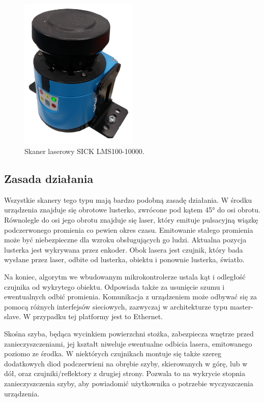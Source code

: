 	\begin{figure}[h]
	\centering
	\includegraphics[width=0.5\textwidth]{graphics/sensor.png}
	\caption{Skaner laserowy SICK LMS100-10000.}
	\label{fig:sensor}
	\end{figure} 

	\subsection{Zasada działania}
		Wszystkie skanery tego typu mają bardzo podobną zasadę działania.
		W środku urządzenia znajduje się obrotowe lusterko, zwrócone pod kątem 45° do osi obrotu.
		Równolegle do osi jego obrotu znajduje się laser, który emituje pulsacyjną wiązkę podczerwonego promienia co pewien okres czasu.
		Emitowanie stałego promienia może być niebezpieczne dla wzroku obsługujących go ludzi.
		Aktualna pozycja lusterka jest wykrywana przez enkoder.
		Obok lasera jest czujnik, który bada wysłane przez laser, odbite od lusterka, obiektu i ponownie lusterka, światło.

		Na koniec, algorytm we wbudowanym mikrokontrolerze ustala kąt i odległość czujnika od wykrytego obiektu.
		Odpowiada także za usunięcie szumu i ewentualnych odbić promienia.
		Komunikacja z urządzeniem może odbywać się za pomocą różnych interfejsów sieciowych, zazwyczaj w architekturze typu master-slave.
		W przypadku tej platformy jest to Ethernet.
		
		Skośna szyba, będąca wycinkiem powierzchni stożka, zabezpiecza wnętrze przed zanieczyszczeniami, jej kształt niweluje ewentualne odbicia lasera, emitowanego poziomo ze środka.
		W niektórych czujnikach montuje się także szereg dodatkowych diod podczerwieni na obrębie szyby, skierowanych w górę, lub w dół, oraz czujniki/reflektory z drugiej strony.
		Pozwala to na wykrycie stopnia zanieczyszczenia szyby, aby powiadomić użytkownika o potrzebie wyczyszczenia urządzenia.

